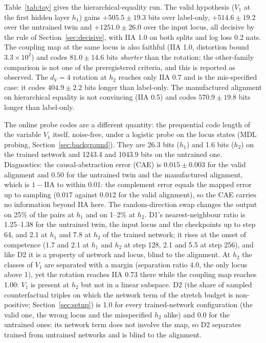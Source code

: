 \documentclass[11pt,a4paper]{article}
\newcommand{\dv}{d_V}
\begin{document}
Table~\ref{tab:toy} gives the hierarchical-equality run. The valid hypothesis ($V_1$ at the first hidden layer $h_1$) gains $+505.5\pm19.3$ bits over label-only, $+514.6\pm19.2$ over the untrained twin and $+1251.0\pm26.0$ over the input locus, all decisive by the rule of Section~\ref{sec:decisive}, with IIA 1.0 on both splits and log loss 0.2 nats. The coupling map at the same locus is also faithful (IIA 1.0, distortion bound $3.3\times10^2$) and codes $81.0\pm14.6$ bits \emph{shorter} than the rotation; the other-family comparison is not one of the preregistered criteria, and this is reported as observed. The $\dv=4$ rotation at $h_2$ reaches only IIA 0.7 and is the mis-specified case: it codes $404.9\pm2.2$ bits longer than label-only. The manufactured alignment on hierarchical equality is not convincing (IIA 0.5) and codes $570.9\pm19.8$ bits longer than label-only.

The online probe codes are a different quantity: the prequential code length of the variable $V_1$ itself, noise-free, under a logistic probe on the locus states (MDL probing, Section~\ref{sec:background}). They are 26.3 bits ($h_1$) and 1.6 bits ($h_2$) on the trained network and 1243.4 and 1043.9 bits on the untrained one. Diagnostics: the causal-abstraction error (CAE) is $0.015\pm0.003$ for the valid alignment and $0.50$ for the untrained twin and the manufactured alignment, which is $1-\mathrm{IIA}$ to within 0.01: the complement error equals the mapped error up to sampling ($0.017$ against $0.012$ for the valid alignment), so the CAE carries no information beyond IIA here. The random-direction swap changes the output on 25\% of the pairs at $h_1$ and on 1--2\% at $h_2$. D1's nearest-neighbour ratio is 1.25--1.38 for the untrained twin, the input locus and the checkpoints up to step 64, and 2.1 at $h_1$ and 7.8 at $h_2$ of the trained network; it rises at the onset of competence (1.7 and 2.1 at $h_1$ and $h_2$ at step 128, 2.1 and 5.5 at step 256), and like D2 it is a property of network and locus, blind to the alignment. At $h_2$ the classes of $V_1$ are separated with a margin (separation ratio 4.0, the only locus above 1), yet the rotation reaches IIA 0.73 there while the coupling map reaches 1.00: $V_1$ is present at $h_2$ but not in a linear subspace. D2 (the share of sampled counterfactual triples on which the network term of the stretch budget is non-positive; Section~\ref{sec:setup}) is 1.0 for every trained-network configuration (the valid one, the wrong locus and the misspecified $h_2$ alike) and 0.0 for the untrained ones: its network term does not involve the map, so D2 separates trained from untrained networks and is blind to the alignment.
\end{document}
